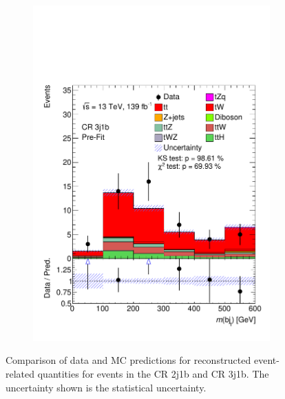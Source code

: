 \begin{figure}[h!]
\begin{subfigure}[b]{0.33\linewidth}
    \includegraphics[width=\linewidth]{ubonn-thesis/Chapters/Chapters_05/Figure/CR_tt/CR_3j1b_M_bj.pdf} 
  \end{subfigure}%
  \caption{Comparison of data and MC predictions for reconstructed event- related quantities for events in the CR 2j1b and CR 3j1b. The uncertainty shown is the statistical uncertainty.}
  \label{fig:CR_tt} 
  \end{figure}
  

  
